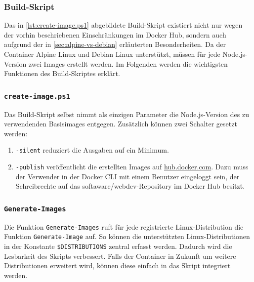 \subsubsection{Build-Skript}

Das in \cref{lst:create-image.ps1} abgebildete Build-Skript existiert nicht nur wegen der vorhin beschriebenen Einschränkungen im Docker Hub, sondern auch aufgrund der in \cref{sec:alpine-vs-debian} erläuterten Besonderheiten.
Da der Container Alpine Linux und Debian Linux unterstützt, müssen für jede Node.js-Version zwei Images erstellt werden.
Im Folgenden werden die wichtigsten Funktionen des Build-Skriptes erklärt.


\subsubsection{\texttt{create-image.ps1}}
Das Build-Skript selbst nimmt als einzigen Parameter die Node.js-Version des zu verwendenden Basisimages entgegen.
Zusätzlich können zwei Schalter gesetzt werden:
\begin{enumerate}
    \item \verb|-silent| reduziert die Ausgaben auf ein Minimum.
    \item \verb|-publish| veröffentlicht die erstellten Images auf \url{hub.docker.com}.
        Dazu muss der Verwender in der Docker CLI mit einem Benutzer eingeloggt sein, der Schreibrechte auf das softaware/webdev-Repository im Docker Hub besitzt.
\end{enumerate}

\subsubsection{\texttt{Generate-Images}}
Die Funktion \verb|Generate-Images| ruft für jede registrierte Linux-Distribution die Funktion \verb|Generate-Image| auf.
So können die unterstützten Linux-Distributionen in der Konstante \verb|$DISTRIBUTIONS| zentral erfasst werden.
Dadurch wird die Lesbarkeit des Skripts verbessert.
Falls der Container in Zukunft um weitere Distributionen erweitert wird, können diese einfach in das Skript integriert werden.

